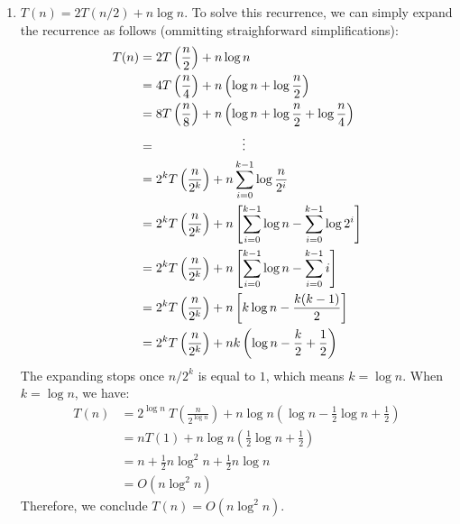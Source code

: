 \documentclass[10pt, letterpaper]{article}
\begin{document}
\begin{enumerate}[label={\bfseries Q\arabic*.}]
\begin{enumerate}
      \item
        $T(n) = 2T(n/2) + n\log n$. To solve this recurrence, we can simply expand the recurrence as follows (ommitting
        straighforward simplifications):
        \begin{align*}
          T(n) &= 2T\left(\frac{n}{2}\right) + n\log n \\
               &= 4T\left(\frac{n}{4}\right) + n\left(\log n + \log \frac{n}{2}\right) \\
               &= 8T\left(\frac{n}{8}\right) + n\left(\log n + \log \frac{n}{2} + \log \frac{n}{4}\right) \\
               &= \hspace{24mm} \vdots \\
               &= 2^kT\left(\frac{n}{2^k}\right) + n \sum_{i=0}^{k-1} \log \frac{n}{2^i} \\
               &= 2^kT\left(\frac{n}{2^k}\right) + n \left[\sum_{i=0}^{k-1} \log n - \sum_{i=0}^{k-1} \log 2^i\right] \\
               &= 2^kT\left(\frac{n}{2^k}\right) + n \left[\sum_{i=0}^{k-1} \log n - \sum_{i=0}^{k-1} i\right] \\
               &= 2^kT\left(\frac{n}{2^k}\right) + n \left[k\log n - \frac{k(k-1)}{2}\right] \\
               &= 2^kT\left(\frac{n}{2^k}\right) + nk\left(\log n - \frac{k}{2} + \frac{1}{2}\right)
        \end{align*}
        The expanding stops once $n/2^k$ is equal to $1$, which means $k = \log n$. When $k = \log n$, we have:
        \begin{align*}
          T(n) &= 2^{\log n}\ T\left(\frac{n}{2^{\log n}}\right) + n\log n\left(\log n - \frac{1}{2}\log n + \frac{1}{2}\right) \\
               &= nT(1) + n\log n \left(\frac{1}{2}\log n + \frac{1}{2}\right) \\
               &= n + \frac{1}{2}n\log^2 n  + \frac{1}{2} n\log n \\
               &= O(n\log^2 n)
        \end{align*}
        Therefore, we conclude $T(n) = O(n\log^2 n)$.


\end{enumerate}
\end{enumerate}
\end{document}
